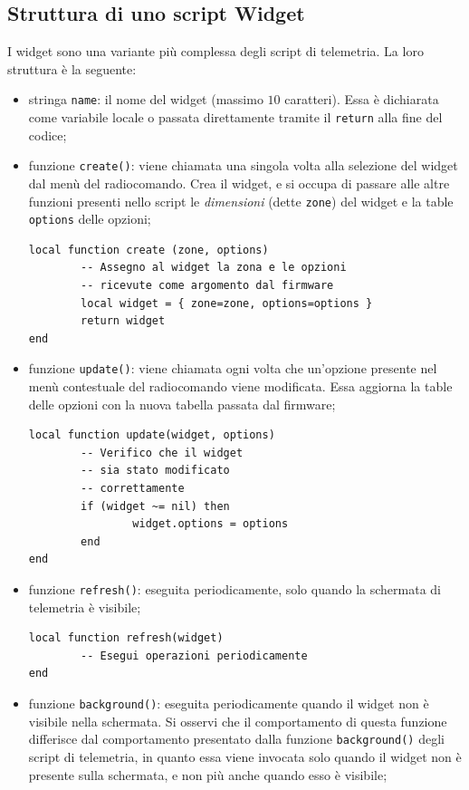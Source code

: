 \documentclass[a4paper, 12pt]{report} %
\begin{document}
\subsection{Struttura di uno script Widget}
I widget sono una variante più complessa degli script di telemetria. La loro struttura è la seguente:
\begin{itemize}
        \item stringa \texttt{name}: il nome del widget (massimo $10$ caratteri). Essa è dichiarata come variabile locale o passata direttamente tramite il \texttt{return} alla fine del codice;
        \item funzione \texttt{create()}: viene chiamata una singola volta alla selezione del widget dal menù del radiocomando. Crea il widget, e si occupa di passare alle altre funzioni presenti nello script le \emph{dimensioni} (dette \texttt{zone}) del widget e la table \texttt{options} delle opzioni;
\begin{lstlisting}
local function create (zone, options)
        -- Assegno al widget la zona e le opzioni
        -- ricevute come argomento dal firmware
        local widget = { zone=zone, options=options }
        return widget
end
\end{lstlisting}
        \item funzione \texttt{update()}: viene chiamata ogni volta che un'opzione presente nel menù contestuale del radiocomando viene modificata. Essa aggiorna la table delle opzioni con la nuova tabella passata dal firmware;
\begin{lstlisting}
local function update(widget, options)
        -- Verifico che il widget
        -- sia stato modificato
        -- correttamente
        if (widget ~= nil) then
                widget.options = options
        end
end
\end{lstlisting}
        \item funzione \texttt{refresh()}: eseguita periodicamente, solo quando la schermata di telemetria è visibile;
\begin{lstlisting}
local function refresh(widget)
        -- Esegui operazioni periodicamente
end
\end{lstlisting}
        \item funzione \texttt{background()}: eseguita periodicamente quando il widget non è visibile nella schermata. Si osservi che il comportamento di questa funzione differisce dal comportamento presentato dalla funzione \texttt{background()} degli script di telemetria, in quanto essa viene invocata solo quando il widget non è presente sulla schermata, e non più anche quando esso è visibile;

\end{itemize}
\end{document}
